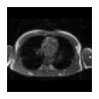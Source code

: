 \begin{figure}
\begin{subfigure}[b]{0.25\textwidth}
        \end{subfigure}%
        \begin{subfigure}[b]{0.25\textwidth}
                \centering
                \includegraphics[width=.95\linewidth]{img_hyperopt/Chest_6810}
        \end{subfigure}
        
        \vspace*{2mm}
        

\end{figure}
